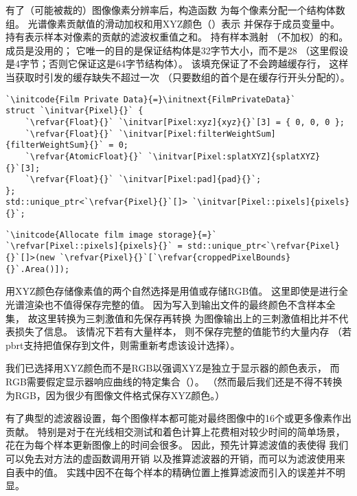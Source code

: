 有了（可能被裁的）图像像素分辨率后，构造函数
为每个像素分配一个结构体数组。
光谱像素贡献值的滑动加权和用XYZ颜色（）表示
并保存于成员变量中。
持有表示样本对像素的贡献的滤波权重值之和。
持有样本溅射
（不加权）的和。
成员是没用的；
它唯一的目的是保证结构体是32字节大小，而不是28
（这里假设是4字节；否则它保证这是64字节结构体）。
该填充保证了不会跨越缓存行，
这样当获取时引发的缓存缺失不超过一次
（只要数组的首个是在缓存行开头分配的）。
\begin{lstlisting}
`\initcode{Film Private Data}{=}\initnext{FilmPrivateData}`
struct `\initvar{Pixel}{}` {
    `\refvar{Float}{}` `\initvar[Pixel:xyz]{xyz}{}`[3] = { 0, 0, 0 };
    `\refvar{Float}{}` `\initvar[Pixel:filterWeightSum]{filterWeightSum}{}` = 0;
    `\refvar{AtomicFloat}{}` `\initvar[Pixel:splatXYZ]{splatXYZ}{}`[3];
    `\refvar{Float}{}` `\initvar[Pixel:pad]{pad}{}`;
};
std::unique_ptr<`\refvar{Pixel}{}`[]> `\initvar[Pixel::pixels]{pixels}{}`;
\end{lstlisting}
\begin{lstlisting}
`\initcode{Allocate film image storage}{=}`
`\refvar[Pixel::pixels]{pixels}{}` = std::unique_ptr<`\refvar{Pixel}{}`[]>(new `\refvar{Pixel}{}`[`\refvar{croppedPixelBounds}{}`.Area()]);
\end{lstlisting}

用XYZ颜色存储像素值的两个自然选择是用值或存储RGB值。
这里即使是进行全光谱渲染也不值得保存完整的值。
因为写入到输出文件的最终颜色不含样本全集，
故这里转换为三刺激值和先保存再转换
为图像输出上的三刺激值相比并不代表损失了信息。
该情况下若有大量样本，
则不保存完整的值能节约大量内存
（若pbrt支持把值保存到文件，则需重新考虑该设计选择）。

我们已选择用XYZ颜色而不是RGB以强调XYZ是独立于显示器的颜色表示，
而RGB需要假定显示器响应曲线的特定集合（）。
（然而最后我们还是不得不转换为RGB，因为很少有图像文件格式保存XYZ颜色。）

有了典型的滤波器设置，每个图像样本都可能对最终图像中的16个或更多像素作出贡献。
特别是对于在光线相交测试和着色计算上花费相对较少时间的简单场景，
花在为每个样本更新图像上的时间会很多。
因此，预先计算滤波值的表使得
我们可以免去对方法的虚函数调用开销
以及推算滤波器的开销，而可以为滤波使用来自表中的值。
实践中因不在每个样本的精确位置上推算滤波而引入的误差并不明显。


